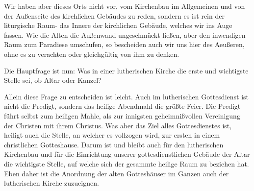 Wir haben aber dieses Orts nicht vor, vom Kirchenbau im Allgemeinen und von der Außenseite des kirchlichen Gebäudes zu reden, sondern es ist rein der liturgische Raum- das Innere der kirchlichen Gebäude, welches wir ins Auge fassen. Wie die Alten die Außenwand ungeschmückt ließen, aber den inwendigen Raum zum Paradiese umschufen, so bescheiden auch wir uns hier des Aeußeren, ohne es zu verachten oder gleichgültig von ihm zu denken.

Die Hauptfrage ist nun: Was in einer lutherischen Kirche die erste und wichtigste Stelle sei, ob Altar oder Kanzel?

Allein diese Frage zu entscheiden ist leicht. Auch im lutherischen Gottesdienst ist nicht die Predigt, sondern das heilige Abendmahl die größte Feier. Die Predigt führt selbst zum heiligen Mahle, als zur innigsten geheimnißvollen Vereinigung der Christen mit ihrem Christus. Was aber das Ziel alles Gottesdienstes ist, heiligt auch die Stelle, an welcher es vollzogen wird, zur ersten in einem christlichen Gotteshause. Darum ist und bleibt auch für den lutherischen Kirchenbau und für die Einrichtung unserer gottesdienstlichen Gebäude der Altar die wichtigste Stelle, auf welche sich der gesammte heilige Raum zu beziehen hat. Eben daher ist die Anordnung der alten Gotteshäuser im Ganzen auch der lutherischen Kirche zuzueignen.

